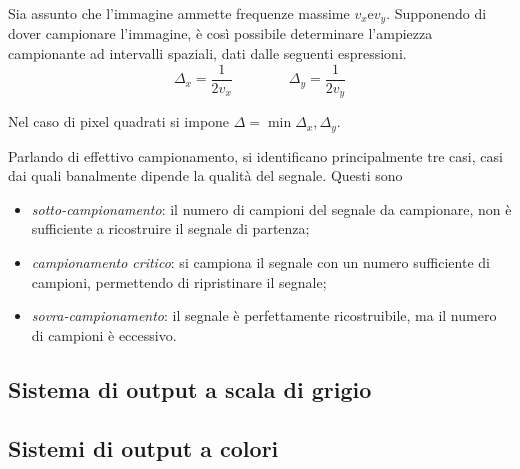 \documentclass{subfiles}
\begin{document}
Sia assunto che l'immagine ammette frequenze massime \(v_{x} \text{e} v_{y}\).
Supponendo di dover campionare l'immagine, è così possibile determinare l'ampiezza campionante ad intervalli spaziali, dati dalle seguenti espressioni.
\[
    \Delta_{x} = \frac{1}{2v_{x}} \qquad \qquad \Delta_{y} = \frac{1}{2 v_{y}}
\]

\noindent Nel caso di pixel quadrati si impone \(\Delta = \min{\Delta_{x}, \Delta_{y}}\).

Parlando di effettivo campionamento, si identificano principalmente tre casi, casi dai quali banalmente dipende la qualità del segnale. Questi sono
\begin{itemize}
    \item \emph{sotto-campionamento}: il numero di campioni del segnale da campionare, non è sufficiente a ricostruire il segnale di partenza;
    \item \emph{campionamento critico}: si campiona il segnale con un numero sufficiente di campioni, permettendo di ripristinare il segnale;
    \item \emph{sovra-campionamento}: il segnale è perfettamente ricostruibile, ma il numero di campioni è eccessivo.
\end{itemize}

\subsection{Sistema di output a scala di grigio}


\subsection{Sistemi di output a colori}

\clearpage
\end{document}
